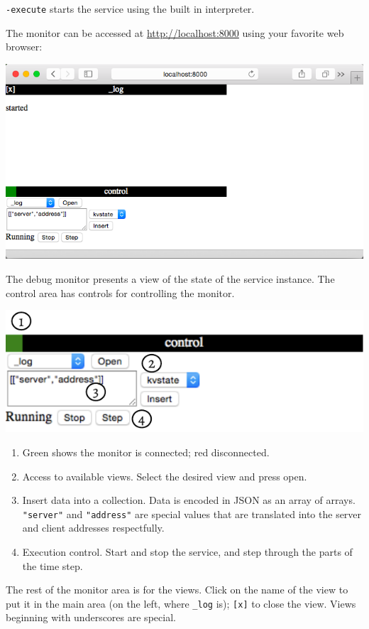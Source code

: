 \documentclass[a5paper,12pt,onecolumn]{article}
\def\code#1{\mbox{\lstinline{#1}}}
\begin{document}
\code{-execute} starts the service using the built in interpreter.

The monitor can be accessed at \url{http://localhost:8000} using your favorite web browser:

\includegraphics{start/monitor.png}

The debug monitor presents a view of the state of the service instance. The control area has controls for controlling the monitor.

\includegraphics{start/control}

\begin{enumerate}
\item Green shows the monitor is connected; red disconnected.
\item Access to available views. Select the desired view and press open.
\item Insert data into a collection. Data is encoded in JSON as an array of arrays. \code{"server"} and \code{"address"} are special values that are translated into the server and client addresses respectfully.
\item Execution control. Start and stop the service, and step through the parts of the time step.
\end{enumerate}

The rest of the monitor area is for the views. Click on the name of the view to put it in the main area (on the left, where \code{_log} is); \code{[x]} to close the view. Views beginning with underscores are special.
\end{document}
